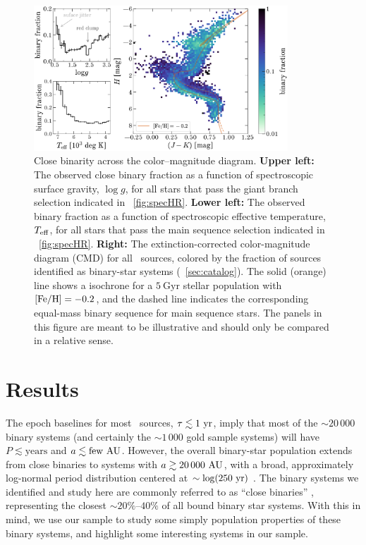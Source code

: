 \documentclass[modern]{aastex63}
\begin{document}
\begin{figure}[!t]
    \begin{center}
    \includegraphics[width=0.85\textwidth]{binary-fraction.pdf}
    \end{center}
    \caption{%
    Close binarity across the color--magnitude diagram.
    \textbf{Upper left:} The observed close binary fraction as a function of
    spectroscopic surface gravity, $\log g$, for all stars that pass the
    giant branch selection indicated in \figurename~\ref{fig:specHR}.
    \textbf{Lower left:} The observed binary fraction as a function of
    spectroscopic effective temperature, $T_{\rm eff}$, for all stars that pass
    the main sequence selection indicated in \figurename~\ref{fig:specHR}.
    \textbf{Right:} The extinction-corrected  color-magnitude
    diagram (CMD) for all \apogee\ sources, colored by the fraction of sources
    identified as binary-star systems (\sectionname~\ref{sec:catalog}).
    The solid (orange) line shows a  isochrone for a
    $5~\mathrm{Gyr}$ stellar population with ${[{\rm Fe}/{\rm H}]} = -0.2$, and the dashed line
    indicates the corresponding equal-mass binary sequence for main sequence
    stars.
    The panels in this figure are meant to be illustrative and should only be
    compared in a relative sense.
    \label{fig:binary-CMD}
    }
\end{figure}


\section{Results} \label{sec:results}

The epoch baselines for most \apogee\ sources, $\tau \lesssim 1~\mathrm{yr}$, imply that
most of the $\sim 20\,000$ binary systems (and certainly the $\sim 1\,000$ gold
sample systems) will have $P \lesssim \mathrm{years}$ and $a \lesssim
\mathrm{few}~\mathrm{AU}$.
However, the overall binary-star population extends from close binaries to
systems with $a\gtrsim 20\,000~\mathrm{AU}$, with a broad, approximately log-normal
period distribution centered at $\sim \log(250~\mathrm{yr})$ \citep{Raghavan:2010}.
The binary systems we identified and study here are commonly referred to as
``close binaries'' \citep{Moe:2018, Badenes:2018}, representing the closest
$\sim 20\%$--$40\%$ of all bound binary star systems.
With this in mind, we use our sample to study some simply population properties
of these binary systems, and highlight some interesting systems in our sample.
\end{document}
